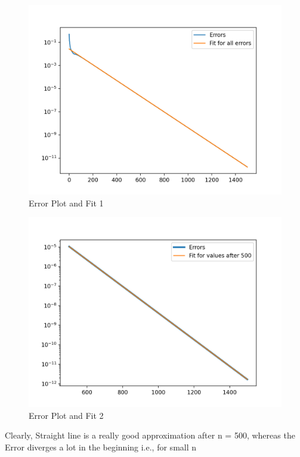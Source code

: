 \documentclass[12pt, a4paper]{report}
\begin{document}
\begin{figure}[!tbh]
   	\centering
   	\includegraphics[scale=0.84]{Q3a.png}
	\caption{Error Plot and Fit 1}
   	\label{fig:allgraphs}
 \end{figure} 

\begin{figure}[!tbh]
   	\centering
   	\includegraphics[scale=0.84]{Q3b.png}
   	\caption{Error Plot and Fit 2}
   	\label{fig:allgraphs}
 \end{figure} 
 
 \newpage
Clearly, Straight line is a really good approximation after n = 500, whereas the Error diverges a lot in the beginning i.e., for small n
\end{document}
